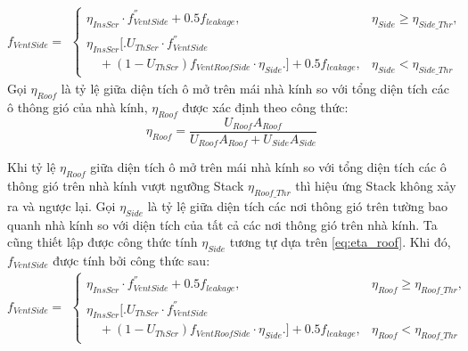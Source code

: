 \documentclass[a4paper]{article}
\begin{document}
\begin{equation}\label{eq:13}
    f_{VentSide} =
    \begin{alignedat}{2}
        \begin{cases}
            \eta_{InsScr}\cdot f^{''}_{VentSide} + 0.5f_{leakage},            &\eta_{Side} \geq \eta_{Side\_Thr}, \\
            \eta_{InsScr} \big[ \big. U_{ThScr}\cdot f^{''}_{VentSide}                                          \\
            \quad+ (1 - U_{ThScr}) f_{VentRoofSide}\cdot \eta_{Side} \big. \big] + 0.5f_{leakage},                                            &\eta_{Side} < \eta_{Side\_Thr}
        \end{cases}
    \end{alignedat}
\end{equation}
\fi
Gọi $\eta_{Roof}$ là tỷ lệ giữa diện tích ô mở trên mái nhà kính so với tổng diện tích các ô thông gió của nhà kính, $\eta_{Roof}$ được xác định theo công thức:
\begin{equation}\label{eq:eta_roof}
    \eta_{Roof} = \dfrac{U_{Roof}A_{Roof}}{U_{Roof}A_{Roof}+U_{Side}A_{Side}}
\end{equation}
\par
Khi tỷ lệ $\eta_{Roof}$ giữa diện tích ô mở trên mái nhà kính so với tổng diện tích các ô thông gió trên nhà kính vượt ngưỡng Stack $\eta_{Roof\_Thr}$ thì hiệu ứng Stack không xảy ra và ngược lại. Gọi $\eta_{Side}$ là tỷ lệ giữa diện tích các nơi thông gió trên tường bao quanh nhà kính so với diện tích của tất cả các nơi thông gió trên nhà kính. Ta cũng thiết lập được công thức tính $\eta_{Side}$ tương tự dựa trên \eqref{eq:eta_roof}. Khi đó, $f_{VentSide}$ được tính bởi công thức sau:
\begin{equation}\label{eq:13}
    f_{VentSide} =
    \begin{alignedat}{2}
        \begin{cases}
            \eta_{InsScr}\cdot f^{''}_{VentSide} + 0.5f_{leakage},            &\eta_{Roof} \geq \eta_{Roof\_Thr}, \\
            \eta_{InsScr} \big[ \big. U_{ThScr}\cdot f^{''}_{VentSide}                                          \\
            \quad+ (1 - U_{ThScr}) f_{VentRoofSide}\cdot \eta_{Side} \big. \big] + 0.5f_{leakage},                                            &\eta_{Roof} < \eta_{Roof\_Thr}
        \end{cases}
    \end{alignedat}
\end{equation}
\end{document}
